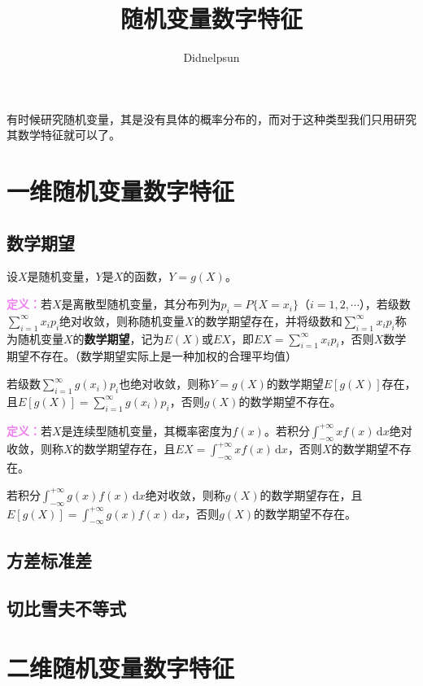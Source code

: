\documentclass[UTF8, 12pt]{ctexart}
\author{Didnelpsun}
\title{随机变量数字特征}
\date{}
\begin{document}
\maketitle
\pagestyle{empty}
\thispagestyle{empty}
\tableofcontents
\thispagestyle{empty}
\newpage
\pagestyle{plain}
\setcounter{page}{1}

有时候研究随机变量，其是没有具体的概率分布的，而对于这种类型我们只用研究其数学特征就可以了。

\section{一维随机变量数字特征}

\subsection{数学期望}

设$X$是随机变量，$Y$是$X$的函数，$Y=g(X)$。

\textcolor{violet}{\textbf{定义：}}若$X$是离散型随机变量，其分布列为$p_i=P\{X=x_i\}$（$i=1,2,\cdots$），若级数$\sum\limits_{i=1}^\infty x_ip_i$绝对收敛，则称随机变量$X$的数学期望存在，并将级数和$\sum\limits_{i=1}^\infty x_ip_i$称为随机变量$X$的\textbf{数学期望}，记为$E(X)$或$EX$，即$EX=\sum\limits_{i=1}^\infty x_ip_i$，否则$X$数学期望不存在。（数学期望实际上是一种加权的合理平均值）

若级数$\sum\limits_{i=1}^\infty g(x_i)p_i$也绝对收敛，则称$Y=g(X)$的数学期望$E[g(X)]$存在，且$E[g(X)]=\sum\limits_{i=1}^\infty g(x_i)p_i$，否则$g(X)$的数学期望不存在。

\textcolor{violet}{\textbf{定义：}}若$X$是连续型随机变量，其概率密度为$f(x)$。若积分$\int_{-\infty}^{+\infty}xf(x)\,\textrm{d}x$绝对收敛，则称$X$的数学期望存在，且$EX=\int_{-\infty}^{+\infty}xf(x)\,\textrm{d}x$，否则$X$的数学期望不存在。

若积分$\int_{-\infty}^{+\infty}g(x)f(x)\,\textrm{d}x$绝对收敛，则称$g(X)$的数学期望存在，且$E[g(X)]=\int_{-\infty}^{+\infty}g(x)f(x)\,\textrm{d}x$，否则$g(X)$的数学期望不存在。

\subsection{方差标准差}

\subsection{切比雪夫不等式}

\section{二维随机变量数字特征}
\end{document}
